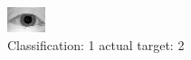 \begin{figure}[h!]
\begin{center}
\includegraphics[width=0.60\columnwidth]{figures/ID982_class_1_target_2.png}
\end{center}
\caption{ Classification: 1 actual target: 2}
\label{fig:ID982_class_1_target_2}
\end{figure}
